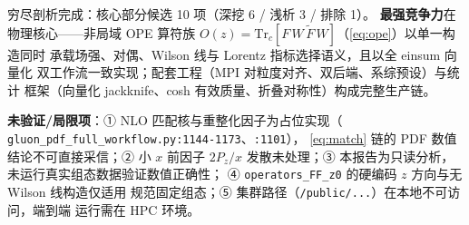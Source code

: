 \documentclass[UTF8]{ctexart}
\begin{document}
\begin{conclbox}
穷尽剖析完成：核心部分候选 10 项（深挖 6 / 浅析 3 / 排除 1）。
\textbf{最强竞争力}在物理核心——非局域 OPE 算符族
$O(z)=\mathrm{Tr}_c[F\,W\,\tilde{F}\,W]$（\eqref{eq:ope}）以单一构造同时
承载场强、对偶、Wilson 线与 Lorentz 指标选择语义，且以全 einsum 向量化
双工作流一致实现；配套工程（MPI 对粒度对齐、双后端、系综预设）与统计
框架（向量化 jackknife、cosh 有效质量、折叠对称性）构成完整生产链。
\end{conclbox}

\begin{warnbox}
\textbf{未验证/局限项}：① NLO 匹配核与重整化因子为占位实现（
\texttt{\nolinkurl{gluon\_pdf\_full\_workflow.py:1144-1173}}、\texttt{:1101}），
\eqref{eq:match} 链的 PDF 数值结论不可直接采信；② 小 $x$ 前因子 $2P_z/x$
发散未处理；③ 本报告为只读分析，未运行真实组态数据验证数值正确性；
④ \texttt{operators\_FF\_z0} 的硬编码 $z$ 方向与无 Wilson 线构造仅适用
规范固定组态；⑤ 集群路径（\texttt{/public/...}）在本地不可访问，端到端
运行需在 HPC 环境。
\end{warnbox}
\end{document}
